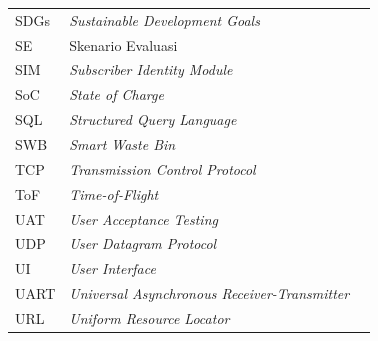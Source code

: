 \begin{longtable}{@{} l >{\raggedright\arraybackslash}p{8cm} c @{}}
SDGs   & \textit{Sustainable Development Goals}                   & \pageref{chap:studi-literatur} \\
SE     & Skenario Evaluasi                                        & \pageref{sec:metode-evaluasi} \\
SIM    & \textit{Subscriber Identity Module}                      & \pageref{tab:pemilihan-teknologi} \\
SoC    & \textit{State of Charge}                                 & \pageref{sec:perancangan-iot} \\
SQL    & \textit{Structured Query Language}                       & \pageref{sec:perancangan-database} \\
SWB    & \textit{Smart Waste Bin}                                 & \pageref{sec:analisis-solusi} \\
TCP    & \textit{Transmission Control Protocol}                   & \pageref{chap:studi-literatur} \\
ToF    & \textit{Time-of-Flight}                                  & \pageref{chap:studi-literatur} \\
UAT    & \textit{User Acceptance Testing}                         & \pageref{chap:pendahuluan} \\
UDP    & \textit{User Datagram Protocol}                          & \pageref{chap:studi-literatur} \\
UI     & \textit{User Interface}                                  & \pageref{tab:hasil-ui} \\
UART   & \textit{Universal Asynchronous Receiver-Transmitter}     & \pageref{tab:perbandingan-mcu} \\
URL    & \textit{Uniform Resource Locator}                        & \pageref{tab:tautan-penting} \\

\end{longtable}